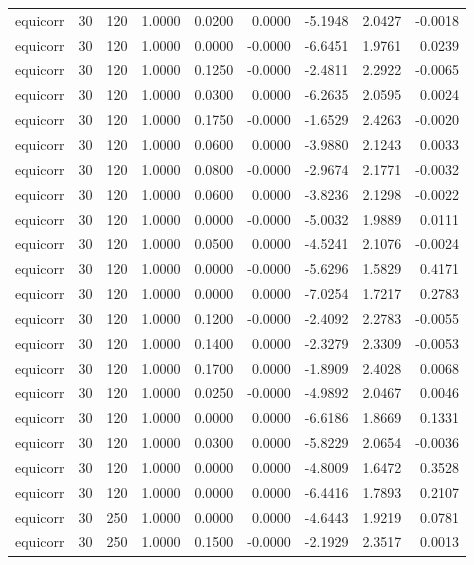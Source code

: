 \begin{tabular}{lrrrrrrrr}
equicorr & 30 & 120 & 1.0000 & 0.0200 & 0.0000 & -5.1948 & 2.0427 & -0.0018 \\
equicorr & 30 & 120 & 1.0000 & 0.0000 & -0.0000 & -6.6451 & 1.9761 & 0.0239 \\
equicorr & 30 & 120 & 1.0000 & 0.1250 & -0.0000 & -2.4811 & 2.2922 & -0.0065 \\
equicorr & 30 & 120 & 1.0000 & 0.0300 & 0.0000 & -6.2635 & 2.0595 & 0.0024 \\
equicorr & 30 & 120 & 1.0000 & 0.1750 & -0.0000 & -1.6529 & 2.4263 & -0.0020 \\
equicorr & 30 & 120 & 1.0000 & 0.0600 & 0.0000 & -3.9880 & 2.1243 & 0.0033 \\
equicorr & 30 & 120 & 1.0000 & 0.0800 & -0.0000 & -2.9674 & 2.1771 & -0.0032 \\
equicorr & 30 & 120 & 1.0000 & 0.0600 & 0.0000 & -3.8236 & 2.1298 & -0.0022 \\
equicorr & 30 & 120 & 1.0000 & 0.0000 & -0.0000 & -5.0032 & 1.9889 & 0.0111 \\
equicorr & 30 & 120 & 1.0000 & 0.0500 & 0.0000 & -4.5241 & 2.1076 & -0.0024 \\
equicorr & 30 & 120 & 1.0000 & 0.0000 & -0.0000 & -5.6296 & 1.5829 & 0.4171 \\
equicorr & 30 & 120 & 1.0000 & 0.0000 & 0.0000 & -7.0254 & 1.7217 & 0.2783 \\
equicorr & 30 & 120 & 1.0000 & 0.1200 & -0.0000 & -2.4092 & 2.2783 & -0.0055 \\
equicorr & 30 & 120 & 1.0000 & 0.1400 & 0.0000 & -2.3279 & 2.3309 & -0.0053 \\
equicorr & 30 & 120 & 1.0000 & 0.1700 & 0.0000 & -1.8909 & 2.4028 & 0.0068 \\
equicorr & 30 & 120 & 1.0000 & 0.0250 & -0.0000 & -4.9892 & 2.0467 & 0.0046 \\
equicorr & 30 & 120 & 1.0000 & 0.0000 & 0.0000 & -6.6186 & 1.8669 & 0.1331 \\
equicorr & 30 & 120 & 1.0000 & 0.0300 & 0.0000 & -5.8229 & 2.0654 & -0.0036 \\
equicorr & 30 & 120 & 1.0000 & 0.0000 & 0.0000 & -4.8009 & 1.6472 & 0.3528 \\
equicorr & 30 & 120 & 1.0000 & 0.0000 & 0.0000 & -6.4416 & 1.7893 & 0.2107 \\
equicorr & 30 & 250 & 1.0000 & 0.0000 & 0.0000 & -4.6443 & 1.9219 & 0.0781 \\
equicorr & 30 & 250 & 1.0000 & 0.1500 & -0.0000 & -2.1929 & 2.3517 & 0.0013 \\

\end{tabular}
